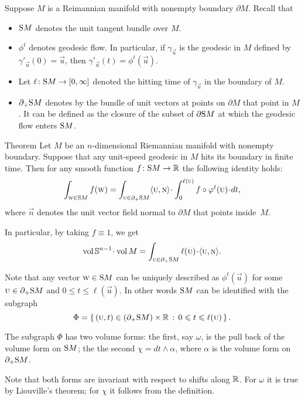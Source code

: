 Suppose $M$ is a Reimannian manifold with nonempty boundary $\partial M$.
Recall that 
\begin{itemize}
\item $\S M$ denotes the unit tangent bundle over $M$.
\item $\phi^t$ denotes geodesic flow.
In particular, if $\gamma_{\vec u}$ is the geodesic in $M$ defined by $\gamma'_{\vec u}(0)=\vec u$, then $\gamma'_{\vec u}(t)=\phi^t(\vec u)$.
\item Let $\ell\:\S M\to [0,\infty]$ denoted the hitting time of $\gamma_{\vec u}$ in the boundary of $M$.
\item $\partial_+\S  M$ denotes by the bundle of unit vectors at points on $\partial M$ that point in $M$. It can be defined as the closure of the subset of $\partial \S M$ at which the geodesic flow enters $\S M$.

\end{itemize}

\begin{thm}{Theorem}\label{thm:santalo}
Let $M$ be an $n$-dimensional Riemannian manifold with nonempty boundary.
Suppose that any unit-speed geodesic in $M$ hits its boundary in finite time.
Then for any smooth function $f\:\S M\to\RR$ the following identity holds:
\[\int_{\vec w\in \S M}f(\vec w)
=
\int_{\vec u\in \partial_+\S  M} 
\langle\vec u,\vec n\rangle\cdot
\int_0^{\ell(\vec u)} f\circ\phi^t(\vec u)\cdot dt,\]
where $\vec n$ denotes the unit vector field normal to $\partial M$ that points inside~$M$.

In particular, by taking $f\equiv 1$, we get
\[\vol\SSS^{n-1}\cdot\vol M=\int_{\vec u\in \partial_+\S  M} \ell(\vec u)\cdot\langle\vec u,\vec n\rangle.\]

\end{thm}

Note that any vector $\vec w\in\S M$ can be uniquely described as $\phi^t(\vec u)$ for some $\vec u\in \partial_+\S  M$ and $0\le t\le \ell(\vec u)$.
In other words $\S M$ can be identified with the subgraph 
\[\Phi=\set{(\vec u,t)\in (\partial_+\S  M)\times \RR}{0\le t\le \ell(\vec u)}.\]

The subgraph $\Phi$ has two volume forms: the first, say $\omega$, is the pull back of the volume form  on $\S M$;
the the second $\chi=dt \wedge \alpha$, where $\alpha$ is the volume form on $\partial_+\S  M$.





Note that both forms are invariant with respect to shifts along $\RR$.
For $\omega$ it is true by Liouville's theorem;
for $\chi$ it follows from the definition.

